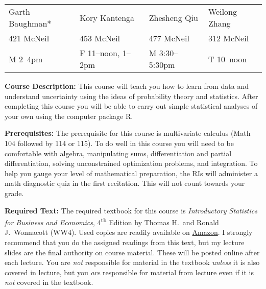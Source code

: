 \documentclass[11pt, letterpaper]{article}
\begin{document}
\begin{tabular}{llll}
Garth Baughman*&Kory Kantenga& Zhesheng Qiu&Weilong Zhang\\
421 McNeil&	453 McNeil&477 McNeil & 312 McNeil\\
M 2--4pm&F 11--noon, 1--2pm & M 3:30--5:30pm& T 10--noon\\
\end{tabular}


\bigskip

\noindent \textbf{Course Description:} This course will teach you how to learn from data and understand uncertainty using the ideas of probability theory and statistics. After completing this course you will be able to carry out simple statistical analyses of your own using the computer package R.


\medskip

\noindent \textbf{Prerequisites:} The prerequisite for this course is multivariate calculus (Math 104 followed by 114 or 115). To do well in this course you will need to be comfortable with algebra, manipulating sums, differentiation and partial differentiation, solving unconstrained optimization problems, and integration. To help you gauge your level of mathematical preparation, the RIs will administer a math diagnostic quiz in the first recitation. This will not count towards your grade.




\medskip

\noindent \textbf{Required Text:} The required textbook for this course is \emph{Introductory Statistics for Business and Economics}, 4\textsuperscript{th} Edition by Thomas H.\ and Ronald J.\ Wonnacott (WW4). Used copies are readily available on \href{http://tinyurl.com/ECON103-2013A}{Amazon}. I strongly recommend that you do the assigned readings from this text, but my lecture slides are the final authority on course material. These will be posted online after each lecture. You are \emph{not} responsible for material in the textbook \emph{unless} it is also covered in lecture, but you \emph{are} responsible for material from lecture even if it is \emph{not} covered in the textbook.

\medskip
\end{document}
